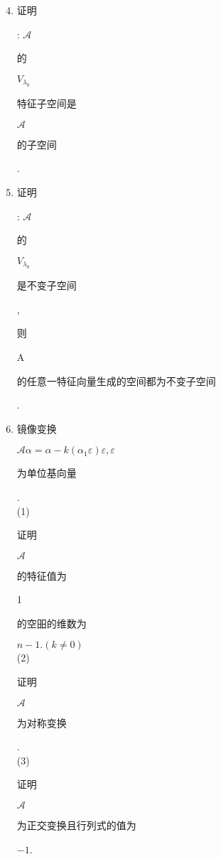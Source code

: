 \documentclass[10pt]{article}
\begin{document}
\begin{enumerate}
  \setcounter{enumi}{3}
  \item \begin{CJK}{UTF8}{mj}证明\end{CJK}: $\mathscr{A}$ \begin{CJK}{UTF8}{mj}的\end{CJK} $V_{\lambda_{0}}$ \begin{CJK}{UTF8}{mj}特征子空间是\end{CJK} $\mathscr{A}$ \begin{CJK}{UTF8}{mj}的子空间\end{CJK}.

  \item \begin{CJK}{UTF8}{mj}证明\end{CJK}: $\mathscr{A}$ \begin{CJK}{UTF8}{mj}的\end{CJK} $V_{\lambda_{0}}$ \begin{CJK}{UTF8}{mj}是不变子空间\end{CJK}, \begin{CJK}{UTF8}{mj}则\end{CJK} A \begin{CJK}{UTF8}{mj}的任意一特征向量生成的空间都为不变子空间\end{CJK}.

  \item \begin{CJK}{UTF8}{mj}镜像变换\end{CJK} $\mathscr{A} \alpha=\alpha-k\left(\alpha_{1} \varepsilon\right) \varepsilon, \varepsilon$ \begin{CJK}{UTF8}{mj}为单位基向量\end{CJK}.\\
(1) \begin{CJK}{UTF8}{mj}证明\end{CJK} $\mathscr{A}$ \begin{CJK}{UTF8}{mj}的特征值为\end{CJK} 1 \begin{CJK}{UTF8}{mj}的空昍的维数为\end{CJK} $n-1 .(k \neq 0)$\\
(2) \begin{CJK}{UTF8}{mj}证明\end{CJK} $\mathscr{A}$ \begin{CJK}{UTF8}{mj}为对称变换\end{CJK}.\\
(3) \begin{CJK}{UTF8}{mj}证明\end{CJK} $\mathscr{A}$ \begin{CJK}{UTF8}{mj}为正交变换且行列式的值为\end{CJK} $-1$.

\end{enumerate}
\end{document}
